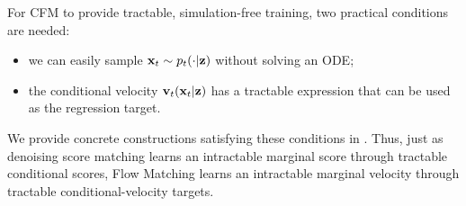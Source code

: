 For CFM to provide tractable, simulation-free training, two practical
conditions are needed:
\begin{itemize}
    \item[(i)] we can easily sample
    ${\mathbf{x}}_t\sim p_t(\cdot|{\mathbf{z}})$ without solving an ODE;
    \item[(ii)] the conditional velocity
    ${\mathbf{v}}_t({\mathbf{x}}_t|{\mathbf{z}})$ has a tractable expression that can be used as the
    regression target.
\end{itemize}
We provide concrete constructions satisfying these conditions in
. Thus, just as denoising score matching learns
an intractable marginal score through tractable conditional scores, Flow
Matching learns an intractable marginal velocity through tractable conditional-velocity targets.


